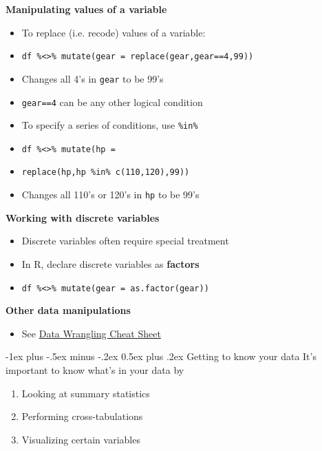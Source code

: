 \documentclass[10pt,landscape]{article}
\makeatletter
\renewcommand{\section}{\@startsection{section}{1}{0mm}%
                                {-1ex plus -.5ex minus -.2ex}%
                                {0.5ex plus .2ex}%
                                {\normalfont\large\bfseries}}
\makeatother
\begin{document}
\begin{multicols}{3}
\smallskip{}

\textbf{Manipulating values of a variable}\\
\begin{itemize}
    \item To replace (i.e. recode) values of a variable:
    \item[] \verb!df %<>% mutate(gear = replace(gear,gear==4,99))!
    \item[] Changes all 4's in \verb!gear! to be 99's
    \item[] \verb!gear==4! can be any other logical condition
    \item To specify a series of conditions, use \verb!%in%!
    \item[] \verb!df %<>% mutate(hp =!
    \item[] \verb!replace(hp,hp %in% c(110,120),99))!
    \item[] Changes all 110's or 120's in \verb!hp! to be 99's
\end{itemize}

\smallskip{}

\textbf{Working with discrete variables}\\
\begin{itemize}
    \item Discrete variables often require special treatment
    \item In R, declare discrete variables as \textbf{factors}
    \item[] \verb!df %<>% mutate(gear = as.factor(gear))!
\end{itemize}

\smallskip{}

\textbf{Other data manipulations}\\
\begin{itemize}
    \item See \href{https://www.rstudio.com/wp-content/uploads/2015/02/data-wrangling-cheatsheet.pdf}{Data Wrangling Cheat Sheet}
\end{itemize}

\section{Getting to know your data}
It's important to know what's in your data by
\begin{enumerate}
    \item Looking at summary statistics
    \item Performing cross-tabulations
    \item Visualizing certain variables
\end{enumerate}


\end{multicols}
\end{document}
